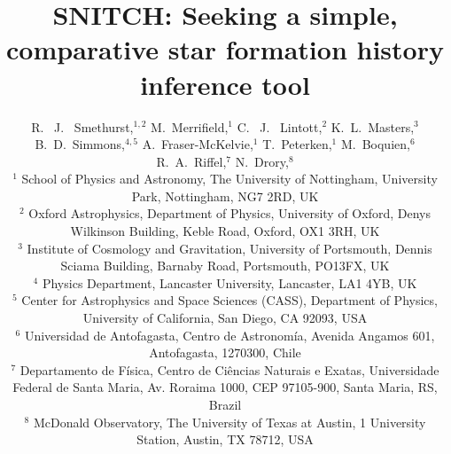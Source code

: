 \documentclass[useAMS,usenatbib]{mn2e}
\begin{document}
\title[\textsc{snitch}: inferring quenching histories]{SNITCH: Seeking a simple, comparative star formation history inference tool}
\author[Smethurst et al. 2018]{R. ~J. ~Smethurst,$^{1,2}$ M.~Merrifield,$^{1}$ C. ~J. ~Lintott,$^{2}$ K.~L.~Masters,$^{3}$ \newauthor B.~D.~Simmons,$^{4,5}$ A.~Fraser-McKelvie,$^{1}$ T.~Peterken,$^{1}$ M.~Boquien,$^{6}$ \newauthor R.~A.~Riffel,$^{7}$ N.~Drory,$^{8}$
\\ $^1$ School of Physics and Astronomy, The University of Nottingham, University Park, Nottingham, NG7 2RD, UK
\\ $^2$ Oxford Astrophysics, Department of Physics, University of Oxford, Denys Wilkinson Building, Keble Road, Oxford, OX1 3RH, UK
\\ $^3$ Institute of Cosmology and Gravitation, 
University of Portsmouth, Dennis Sciama Building, Barnaby Road, Portsmouth, PO13FX, UK
\\ $^4$ Physics Department, Lancaster University, Lancaster, LA1 4YB, UK
\\ $^5$ Center for Astrophysics and Space Sciences (CASS), Department of Physics, University of California, San Diego, CA 92093, USA
\\ $^6$ Universidad de Antofagasta, Centro de Astronom\'ia, Avenida Angamos 601, Antofagasta, 1270300, Chile
\\ $^7$ Departamento de Física, Centro de Ciências Naturais e Exatas,  Universidade Federal de Santa Maria, Av. Roraima 1000, CEP 97105-900, Santa Maria, RS, Brazil 
\\ $^8$ McDonald Observatory, The University of Texas at Austin, 1 University Station, Austin, TX 78712, USA
}

\maketitle
\end{document}
